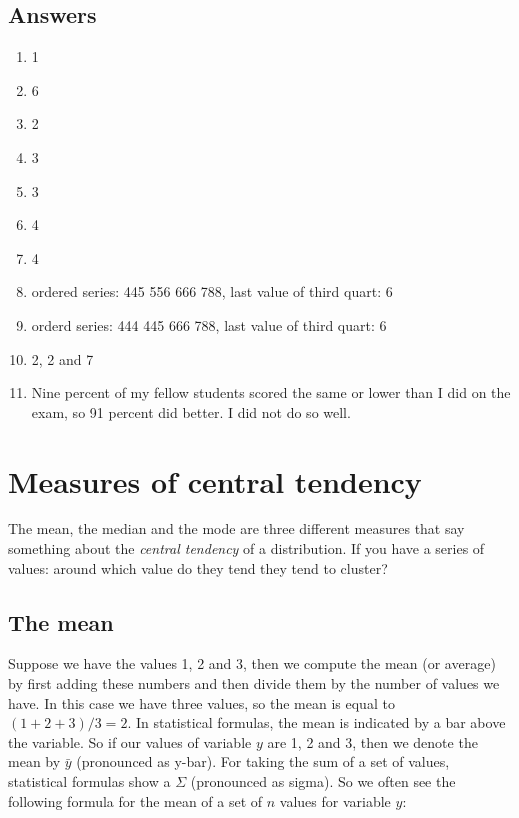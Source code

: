 \documentclass[]{book}\usepackage[]{graphicx}\usepackage[]{color}
\begin{document}
\subsection{Answers}

\begin{enumerate}

\item
1
\item
6
\item
2
\item
3
\item
3
\item
4
\item
4
\item
ordered series: 445 556 666 788, last value of third quart: 6
\item
orderd series: 444 445 666 788, last value of third quart: 6

\item
2, 2 and 7

\item

Nine percent of my fellow students scored the same or lower than I did on the exam, so 91 percent did better. I did not do so well.

\end{enumerate}






\section{Measures of central tendency}

The mean, the median and the mode are three different measures that say something about the \textit{central tendency} of a distribution. If you have a series of values: around which value do they tend they tend to cluster?

\subsection{The mean}
Suppose we have the values 1, 2 and 3, then we compute the mean (or average) by first adding these numbers and then divide them by the number of values we have. In this case we have three values, so the mean is equal to $(1 + 2 + 3)/3 = 2$. In statistical formulas, the mean is indicated by a bar above the variable. So if our values of variable $y$ are 1, 2 and 3, then we denote the mean by $\bar{y}$ (pronounced as y-bar). For taking the sum of a set of values, statistical formulas show a $\Sigma$ (pronounced as sigma). So we often see the following formula for the mean of a set of $n$ values for variable $y$:
\end{document}
